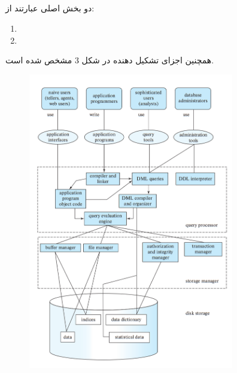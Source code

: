 \documentclass{article}
\begin{document}
\subsection{}
دو بخش اصلی
عبارتند از:
\begin{enumerate}
    \item {}
    \item {}
\end{enumerate}
همچنین اجزای تشکیل دهنده
در شکل 3 مشخص شده است.
\begin{figure}[ht]
    \centering
    \includegraphics[width=0.8\textwidth]{figures/1.3.png}
    \caption{}
    \label{fig:fig1}
\end{figure}
\FloatBarrier
\end{document}
